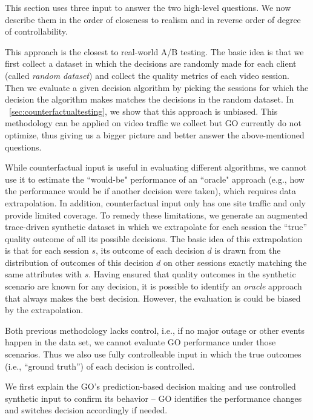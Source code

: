 This section uses three input to answer the two high-level questions. We now describe them in the order of closeness to realism and in reverse order of degree of controllability.

 This approach is the closest to real-world A/B testing. The basic idea is that we first collect a dataset in which the decisions are randomly made for each client (called {\it random dataset}) and collect the quality metrics of each video session. Then we evaluate a given decision algorithm by picking the sessions for which the decision the algorithm makes matches the decisions in the random dataset. In \Section~\ref{sec:counterfactualtesting}, we show that this approach is unbiased. This methodology can be applied on video traffic we collect but GO currently do not optimize, thus giving us a bigger picture and better answer the above-mentioned questions. 

 While counterfactual input is useful in evaluating different algorithms, we cannot use it to estimate the ``would-be" performance of an ``oracle" approach (e.g., how the performance would be if another decision were taken), which requires data extrapolation. In addition, counterfactual input only has one site traffic and only provide limited coverage. To remedy these limitations, we generate an augmented trace-driven synthetic dataset in which we extrapolate for each session the ``true'' quality outcome of all its possible decisions. The basic idea of this extrapolation  is that for each session $s$, its outcome of each decision $d$ is drawn from the distribution of outcomes of this decision $d$ on other sessions exactly matching the same attributes with $s$. Having ensured that quality outcomes in the synthetic scenario are known for any decision, it is possible to identify an {\it oracle} approach that always makes the best decision. However, the evaluation is could be biased by the extrapolation.

 Both previous methodology lacks control, i.e., if no major outage or other events happen in the data set, we cannot evaluate GO performance under those scenarios. Thus we also use fully controlleable input in which the true outcomes (i.e., ``ground truth'') of each decision is controlled.





We first explain the GO's prediction-based decision making and use controlled synthetic input to confirm its behavior -- GO identifies the performance changes and switches decision accordingly if needed.

